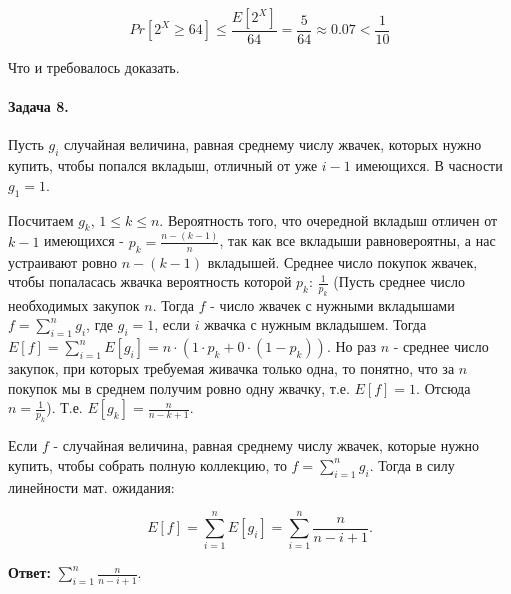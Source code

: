 \documentclass{article}
\begin{document}
    $$ Pr[2^X \ge 64] \le \frac{E[2^X]}{64} = \frac{5}{64} \approx 0.07 < \frac{1}{10}$$

    Что и требовалось доказать.

    \paragraph{Задача 8.}
    Пусть $g_i$ случайная величина, равная среднему числу жвачек, которых нужно купить, чтобы попался вкладыш, отличный от уже $i - 1$ имеющихся. В часности $g_1 = 1$.

    Посчитаем $g_k$, $1 \le k \le n$. Вероятность того, что очередной вкладыш отличен от $k - 1$ имеющихся - $p_k = \frac{n - (k - 1)}{n}$, так как все вкладыши равновероятны, а нас устраивают ровно $n - (k - 1)$ вкладышей. Среднее число покупок жвачек, чтобы попаласась жвачка вероятность которой $p_k$: $\frac{1}{p_k}$ (Пусть среднее число необходимых закупок $n$. Тогда $f$ - число жвачек с нужными вкладышами $f = \sum_{i=1}^{n}g_i$, где $g_i = 1$, если $i$ жвачка с нужным вкладышем. Тогда $E[f] = \sum_{i=1}^{n}E[g_i] = n \cdot (1 \cdot p_k + 0 \cdot (1 - p_k))$. Но раз $n$ - среднее число закупок, при которых требуемая живачка только одна, то понятно, что за $n$ покупок мы в среднем получим ровно одну жвачку, т.е. $E[f] = 1$. Отсюда $n = \frac{1}{p_k}$). Т.е. $E[g_k] = \frac{n}{n - k + 1}$.

    Если $f$ - случайная величина, равная среднему числу жвачек, которые нужно купить, чтобы собрать полную коллекцию, то $f = \sum_{i=1}^{n}g_i$. Тогда в силу линейности мат. ожидания:

    $$ E[f] = \sum_{i=1}^{n} E[g_i] = \sum_{i=1}^{n} \frac{n}{n - i + 1}.$$

    \textbf{Ответ:} $\sum_{i=1}^{n} \frac{n}{n - i + 1}$.
 
\end{document}
